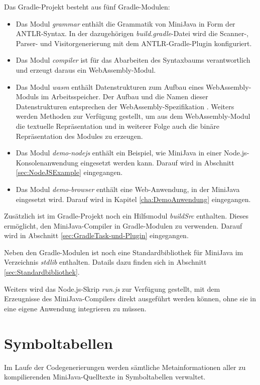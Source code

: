 Das Gradle-Projekt besteht aus fünf Gradle-Modulen:
\begin{itemize}
    \item Das Modul \emph{grammar} enthält die Grammatik von MiniJava in Form der ANTLR-Syntax. In der dazugehörigen \emph{build.gradle}-Datei wird die Scanner-, Parser- und Visitorgenerierung mit dem ANTLR-Gradle-Plugin konfiguriert.
    \item Das Modul \emph{compiler} ist für das Abarbeiten des Syntaxbaums verantwortlich und erzeugt daraus ein WebAssembly-Modul.
    \item Das Modul \emph{wasm} enthält Datenstrukturen zum Aufbau eines Web\-As\-sem\-bly-Mo\-duls im Arbeitsspeicher. Der Aufbau und die Namen dieser Datenstrukturen entsprechen der WebAssembly-Spezifikation \cite{WebAssemblySpecification}. Weiters werden Methoden zur Verfügung gestellt, um aus dem WebAssembly-Modul die textuelle Repräsentation und in weiterer Folge auch die binäre Repräsentation des Modules zu erzeugen.
    \item Das Modul \emph{demo-nodejs} enthält ein Beispiel, wie MiniJava in einer Node.js-Kon\-so\-len\-anwendung eingesetzt werden kann. Darauf wird in Abschnitt \ref{sec:NodeJSExample} eingegangen.
    \item Das Modul \emph{demo-browser} enthält eine Web-Anwendung, in der MiniJava eingesetzt wird. Darauf wird in Kapitel \ref{cha:DemoAnwendung} eingegangen.
\end{itemize}

Zusätzlich ist im Gradle-Projekt noch ein Hilfsmodul \emph{buildSrc} enthalten. Dieses ermöglicht, den MiniJava-Compiler in Gradle-Modulen zu verwenden. Darauf wird in Abschnitt \ref{sec:GradleTask-und-Plugin} eingegangen.

Neben den Gradle-Modulen ist noch eine Standardbibliothek für MiniJava im Verzeichnis \emph{stdlib} enthalten. Datails dazu finden sich in Abschnitt \ref{sec:Standardbibliothek}.

Weiters wird das Node.js-Skrip \emph{run.js} zur Verfügung gestellt, mit dem Erzeugnisse des MiniJava-Compilers direkt ausgeführt werden können, ohne sie in eine eigene Anwendung integrieren zu müssen.

\section{Symboltabellen}

Im Laufe der Codegenerierungen werden sämtliche Metainformationen aller zu kompilierenden MiniJava-Quelltexte in Symboltabellen verwaltet.

